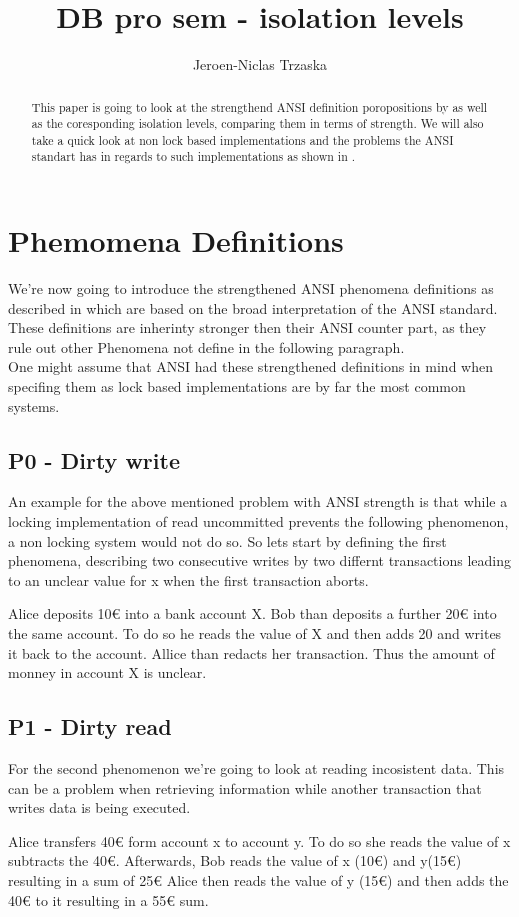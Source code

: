 \documentclass[sigconf, review=true]{acmart}
\author{Jeroen-Niclas Trzaska}
\title{DB pro sem - isolation levels}
\affiliation{%
   \institution{TU Dresden}
   \city{Dresden}
   \state{Saxony}
   \country{Germany}}
\begin{document}
\begin{abstract}

    This paper is going to look at the strengthend ANSI definition poropositions by \cite{Adya_Liskov_O_Neil_2000} as well as the coresponding isolation levels,
    comparing them in terms of strength. We will also take a quick look at non lock based implementations
    and the problems the ANSI standart has in regards to such implementations as shown in \cite{Berenson_Bernstein_Gray_Melton_O_Neil_O_Neil_1995}.
\end{abstract}
\maketitle
\section{Phemomena Definitions}
We're now going to introduce the strengthened ANSI phenomena definitions as described in \cite{Adya_Liskov_O_Neil_2000}  which
are based on the broad interpretation of the ANSI standard. These definitions are inherinty stronger then their ANSI counter part,
as they rule out other Phenomena not define in the following paragraph.\\
One might assume that ANSI had these strengthened definitions in mind when specifing them as lock based implementations
are by far the most common systems.


\subsection{P0 - Dirty write}
An example for the above mentioned problem with ANSI strength is that while a locking implementation of read uncommitted
prevents the following phenomenon, a non locking system would not do so.
So lets start by defining the first phenomena, describing two consecutive writes by two differnt
transactions leading to an unclear value for x when the first transaction aborts.

\begin{example}
    Alice deposits 10€ into a bank account X.
    Bob than deposits a further 20€ into the same account.
    To do so he reads the value of X and then adds 20 and writes it back to the account.
    Allice than redacts her transaction.
    Thus the amount of monney in account X is unclear.
\end{example}

\subsection{P1 - Dirty read}
For the second phenomenon we're going to look at reading incosistent data.
This can be a problem when retrieving information while another transaction
that writes data is being executed.
\begin{example}
    Alice transfers 40€ form account x to account y.
    To do so she reads the value of x subtracts the 40€.
    Afterwards, Bob reads the value of x (10€) and y(15€) resulting in a sum of 25€
    Alice then reads the value of y (15€) and then adds the 40€ to it resulting in a 55€ sum.
\end{example}
\end{document}
